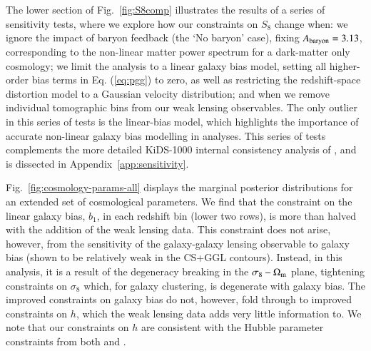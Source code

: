 The lower section of Fig.~\ref{fig:S8comp} illustrates the results of a series of sensitivity tests, where we explore how our constraints on $S_8$ change when: 
we ignore the impact of baryon feedback (the `No baryon' case), fixing $A_{\rm baryon}=3.13$, corresponding to the non-linear matter power spectrum for a dark-matter only cosmology; 
we limit the analysis to a linear galaxy bias model, setting all higher-order bias terms in Eq. (\ref{eq:pgg}) to zero, as well as restricting the redshift-space distortion model  to a Gaussian velocity distribution; 
and when we remove individual tomographic bins from our weak lensing observables. 
The only outlier in this series of tests is the linear-bias model, which highlights the importance of accurate non-linear galaxy bias modelling in \tttp analyses. 
This series of tests complements the more detailed KiDS-1000 internal consistency analysis of \citet{asgari/etal:inprep}, and is dissected in Appendix~\ref{app:sensitivity}.

Fig.~\ref{fig:cosmology-params-all} displays the marginal posterior distributions for an extended set of cosmological parameters.  
We find that the constraint on the linear galaxy bias,  $b_1$, in each redshift bin (lower two rows), is more than halved with the addition of the weak lensing data. 
This constraint does not arise, however, from the sensitivity of the galaxy-galaxy lensing observable to galaxy bias (shown to be relatively weak in the CS+GGL contours). 
Instead, in this analysis, it is a result of the degeneracy breaking in the $\sigma_8-\Omega_{\rm m}$ plane, tightening constraints on $\sigma_8$ which, for galaxy clustering, is degenerate with galaxy bias. 
The improved constraints on galaxy bias do not, however, fold through to improved constraints on $h$, which the weak lensing data adds very little information to. 
We note that our constraints on $h$ are consistent with the Hubble parameter constraints from both \citet{planck/etal:2018} and \citet{riess/etal:2019}.

